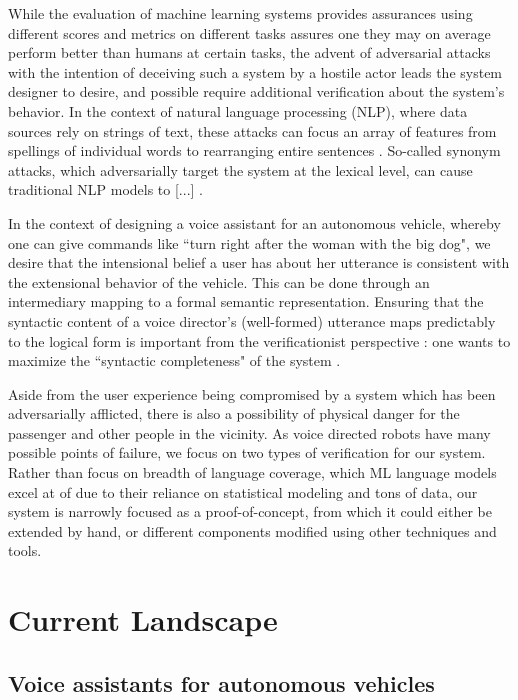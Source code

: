 \documentclass[a4paper, 11pt]{article}
\begin{document}
While the evaluation of machine learning systems provides assurances using
different scores and metrics on different tasks assures one they may on average
perform better than humans at certain tasks, the advent of adversarial attacks
\cite{szegedy} with the intention of deceiving such a system by a hostile actor
leads the system designer to desire, and possible require additional
verification about the system's behavior. In the context of natural language
processing (NLP), where data sources rely on strings of text, these attacks can
focus an array of features from spellings of individual words to rearranging
entire sentences \cite{}. So-called synonym attacks, which adversarially target
the system at the lexical level, can cause traditional NLP models to [...]
\cite{}.

In the context of designing a voice assistant for an autonomous vehicle, whereby
one can give commands like ``turn right after the woman with the big dog",
we desire that the intensional belief a user has about her utterance is
consistent with the extensional behavior of the vehicle. This can be done
through an intermediary mapping to a formal semantic representation. Ensuring
that the syntactic content of a voice director's (well-formed) utterance maps predictably to
the logical form is important from the verificationist perspective : one wants
to maximize the ``syntactic completeness" of the system \cite{macmillan2021}.

Aside from the user experience being compromised by a system which has been
adversarially afflicted, there is also a possibility of physical danger for the
passenger and other people in the vicinity. As voice directed robots have many
possible points of failure, we focus on two types of verification for our
system. Rather than focus on breadth of language coverage, which ML language
models excel at of due to their reliance on statistical modeling and tons
of data, our system is narrowly focused as a proof-of-concept, from which it
could either be extended by hand, or different components modified using
other techniques and tools.

\section{Current Landscape} 

\subsection{Voice assistants for autonomous vehicles}
\end{document}
